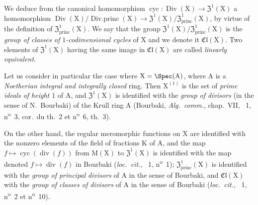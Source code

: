 \begin{env}[21.6.7]
We deduce from the canonical homomorphism $\operatorname{cyc}:\operatorname{Div}(\mathrm{X})\to\mathfrak{Z}^1(\mathrm{X})$ a homomorphism $\operatorname{Div}(\mathrm{X})/\operatorname{Div.princ}(\mathrm{X})\to\mathfrak{Z}^1(\mathrm{X})/\mathfrak{Z}^1_\mathrm{princ}(\mathrm{X})$, by virtue of the definition of $\mathfrak{Z}^1_\mathrm{princ}(\mathrm{X})$.
We say that the group $\mathfrak{Z}^1(\mathrm{X})/\mathfrak{Z}^1_\mathrm{princ}(\mathrm{X})$ is the \emph{group of classes of $1$-codimensional cycles} of $\mathrm{X}$ and we denote it $\mathfrak{Cl}(\mathrm{X})$.
Two elements of $\mathfrak{Z}^1(\mathrm{X})$ having the same image in $\mathfrak{Cl}(\mathrm{X})$ are called \emph{linearly equivalent}.
\end{env}

\begin{env}[21.6.8]
\label{IV.21.6.8}
Let us consider in particular the case where $\mathrm{X}=\Spec(\mathrm{A})$, where $\mathrm{A}$ is a \emph{Noetherian integral and integrally closed} ring.
Then $\mathrm{X}^{(1)}$ is the set of \emph{prime ideals of height $1$} of $\mathrm{A}$, and $\mathfrak{Z}^1(\mathrm{X})$ is identified with the \emph{group of divisors} (in the sense of N.~Bourbaki) of the Krull ring $\mathrm{A}$ (Bourbaki, \emph{Alg.\ comm.}, chap.~VII, \textsection~1, n\textsuperscript{o}~3, cor.\ du th.~2 et n\textsuperscript{o}~6, th.~3).

On the other hand, the regular meromorphic functions on $\mathrm{X}$ are identified with the nonzero elements of the field of fractions $\mathrm{K}$ of $\mathrm{A}$, and the map $f\mapsto\operatorname{cyc}(\operatorname{div}(f))$ from $\mathrm{M}(\mathrm{X})$ to $\mathfrak{Z}^1(\mathrm{X})$ is identified with the map denoted $f\mapsto\operatorname{div}(f)$ in Bourbaki (\emph{loc.\ cit.}, \textsection~1, n\textsuperscript{o}~1);
$\mathfrak{Z}^1_\mathrm{princ}(\mathrm{X})$ is identified with the \emph{group of principal divisors} of $\mathrm{A}$ in the sense of Bourbaki, and $\mathfrak{Cl}(\mathrm{X})$ with the \emph{group of classes of divisors} of $\mathrm{A}$ in the sense of Bourbaki (\emph{loc.\ cit.}, \textsection~1, n\textsuperscript{o}~2 et n\textsuperscript{o}~10).
\end{env}


